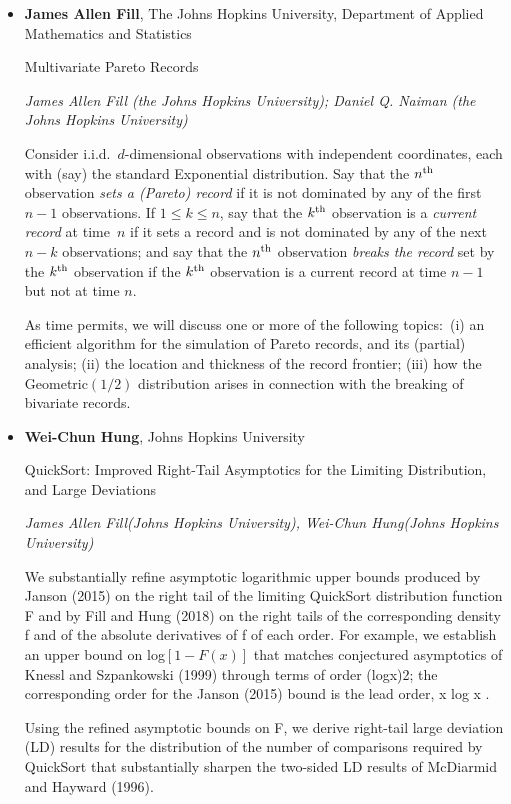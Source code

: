 \begin{itemize}
\item \textbf{James Allen Fill}, The Johns Hopkins University, Department of Applied Mathematics and Statistics

Multivariate Pareto Records

\emph{\footnotesize James Allen Fill (the Johns Hopkins University); Daniel Q. Naiman (the Johns Hopkins University)}

Consider i.i.d.\ $d$-dimensional observations with independent coordinates, each with (say) the standard Exponential distribution.  Say that the $n^{\rm \scriptsize th}$ observation \emph{sets a (Pareto) record} if it is not dominated by any of the first $n - 1$ observations.  If $1 \leq k \leq n$, say that the 
$k^{\rm \scriptsize th}$ observation is a \emph{current record} at time~$n$ if it sets a record and is not dominated by any of the next $n - k$ observations; and say that the $n^{\rm \scriptsize th}$ observation \emph{breaks the record} set by the $k^{\rm \scriptsize th}$ observation if the $k^{\rm \scriptsize th}$ observation is a current record at time $n - 1$ but not at time $n$.

As time permits, we will discuss one or more of the following topics:\ (i) an efficient algorithm for the simulation of Pareto records, and its (partial) analysis; (ii) the location and thickness of the record frontier; (iii) how the Geometric$(1/2)$ distribution arises in connection with the breaking of bivariate records.

\item \textbf{Wei-Chun Hung}, Johns Hopkins University

QuickSort: Improved Right-Tail Asymptotics for the Limiting Distribution, and Large Deviations

\emph{\footnotesize James Allen Fill(Johns Hopkins University), Wei-Chun Hung(Johns Hopkins University)}

We substantially refine asymptotic logarithmic upper bounds produced by Janson (2015) on the right tail of the limiting QuickSort distribution function F and by Fill and Hung (2018) on the right tails of the corresponding density f and of the absolute derivatives of f of each order. For example, we establish an upper bound on log$[1-F(x)]$ that matches conjectured asymptotics of Knessl and Szpankowski (1999) through terms of order (logx)2; the corresponding order for the Janson (2015) bound is the lead order, x log x .

Using the refined asymptotic bounds on F, we derive right-tail large deviation (LD) results for the distribution of the number of comparisons required by QuickSort that substantially sharpen the two-sided LD results of McDiarmid and Hayward (1996).


\end{itemize}
